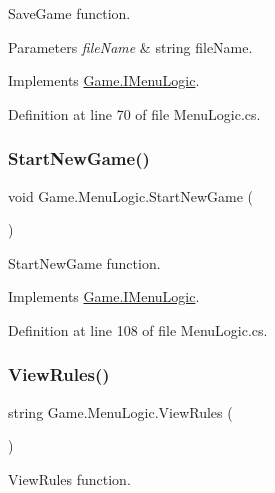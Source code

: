 Save\+Game function. 


\begin{DoxyParams}{Parameters}
{\em file\+Name} & string file\+Name.\\
\hline
\end{DoxyParams}


Implements \mbox{\hyperlink{interface_game_1_1_i_menu_logic_a68b0eadeb8c218443f9261526b1d9d7b}{Game.\+I\+Menu\+Logic}}.



Definition at line 70 of file Menu\+Logic.\+cs.

\mbox{\label{class_game_1_1_menu_logic_ae5471adcbafc9b50c4e2405dfa4c8688}} 
\subsubsection{\texorpdfstring{StartNewGame()}{StartNewGame()}}
{\footnotesize\ttfamily void Game.\+Menu\+Logic.\+Start\+New\+Game (\begin{DoxyParamCaption}{ }\end{DoxyParamCaption})}



Start\+New\+Game function. 



Implements \mbox{\hyperlink{interface_game_1_1_i_menu_logic_a1336eac89b3be808d5fc174b3a972f70}{Game.\+I\+Menu\+Logic}}.



Definition at line 108 of file Menu\+Logic.\+cs.

\mbox{\label{class_game_1_1_menu_logic_a55ba09f791d6e1b2e510178d52ea3e50}} 
\subsubsection{\texorpdfstring{ViewRules()}{ViewRules()}}
{\footnotesize\ttfamily string Game.\+Menu\+Logic.\+View\+Rules (\begin{DoxyParamCaption}{ }\end{DoxyParamCaption})}



View\+Rules function. 

